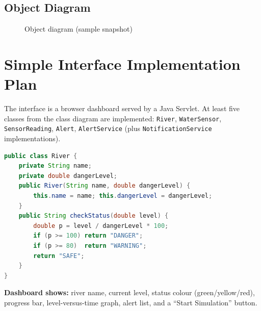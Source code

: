 \documentclass[12pt,a4paper]{article}
\begin{document}
\subsection{Object Diagram}
\begin{figure}[H]\centering
{}
\caption{Object diagram (sample snapshot)}
\end{figure}

\section{Simple Interface Implementation Plan}
The interface is a browser dashboard served by a Java Servlet. At least five classes from the class diagram are implemented: \texttt{River}, \texttt{WaterSensor}, \texttt{SensorReading}, \texttt{Alert}, \texttt{AlertService} (plus \texttt{NotificationService} implementations).
\begin{lstlisting}[language=Java,caption={Status logic in River (core of the system)}]
public class River {
    private String name;
    private double dangerLevel;
    public River(String name, double dangerLevel) {
        this.name = name; this.dangerLevel = dangerLevel;
    }
    public String checkStatus(double level) {
        double p = level / dangerLevel * 100;
        if (p >= 100) return "DANGER";
        if (p >= 80)  return "WARNING";
        return "SAFE";
    }
}
\end{lstlisting}
\textbf{Dashboard shows:} river name, current level, status colour (green/yellow/red), progress bar, level-versus-time graph, alert list, and a ``Start Simulation'' button.
\end{document}
